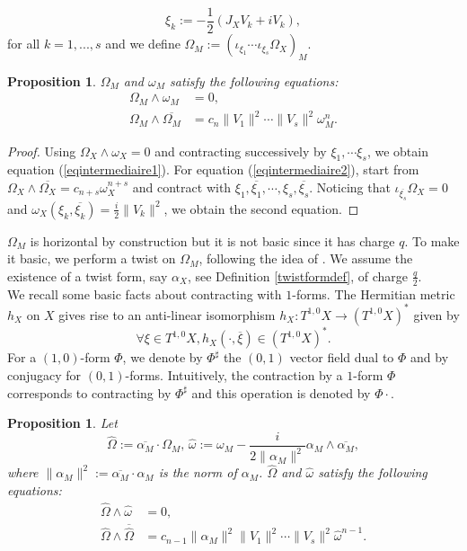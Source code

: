 \documentclass[12pt, reqno]{amsart}
\newtheorem{prop}[Def]{Proposition}
\begin{document}
\[\xi_k:=-\frac{1}{2}(J_XV_k+iV_k),\] for all $k=1,...,s$ and we define $\Omega_M:=(\iota_{\xi_1}\cdots\iota_{\xi_s}\Omega_X)_M$. 
\begin{prop} $\Omega_M$ and $\omega_M$ satisfy the following equations:
    \begin{align}
        \Omega_M\wedge\omega_M&=0, \label{eqintermediaire1} \\
        \Omega_M\wedge\overline{\Omega_M}&=c_n\|V_1\|^2\cdots\|V_s\|^2\omega_M^n.\label{eqintermediaire2}
    \end{align}
\end{prop}
\begin{proof}
    Using $\Omega_X\wedge\omega_X=0$ and contracting successively by $\xi_1,\cdots\xi_s$, we obtain equation (\ref{eqintermediaire1}). For equation  (\ref{eqintermediaire2}), start from $\Omega_X\wedge\overline{\Omega_X}=c_{n+s}\omega_X^{n+s}$ and contract with $\xi_1,\overline{\xi_1},\cdots,\xi_s,\overline{\xi_s}$. Noticing that $\iota_{\overline{\xi_s}}\Omega_X=0$ and $\omega_X(\xi_k,\overline{\xi_k})=\frac{i}{2}\|V_k\|^2$, we obtain the second equation.
\end{proof}
 \indent $\Omega_M$ is horizontal by construction but it is not basic since it has charge $q$. To make it basic, we perform a twist on $\Omega_M$, following the idea of \cite{Larfors_2013,Larfors_2010}. We assume the existence of a twist form, say $\alpha_X$, see Definition \ref{twistformdef}, of charge $\frac{q}{2}$.\\
 \indent We recall some basic facts about contracting with $1$-forms. The Hermitian metric $h_X$ on $X$ gives rise to an  anti-linear isomorphism $h_X : T^{1,0}X\to (T^{1,0}X)^*$ given by \[\forall\xi\in T^{1,0}X, h_X(\cdot,\overline{\xi})\in(T^{1,0}X)^*.\]\indent For a $(1,0)$-form $\Phi$, we denote by $\Phi^\sharp$ the $(0,1)$ vector field dual to $\Phi$ and by conjugacy for $(0,1)$-forms. Intuitively, the contraction by a $1$-form $\Phi$ corresponds to contracting by $\Phi^\sharp$ and this operation is denoted by $\Phi\cdot$.
 \begin{prop}
 Let \[\hat\Omega:=\overline{\alpha_M}\cdot\Omega_M,\,\hat\omega:=\omega_M-\frac{i}{2\|\alpha_M\|^2}\alpha_M\wedge\overline{\alpha_M},\] where $\|\alpha_M\|^2:=\overline{\alpha_M}\cdot\alpha_M$ is the norm of $\alpha_M$.
 $\hat\Omega$ and $\hat\omega$ satisfy the following equations:
     \begin{align}
             \hat\Omega\wedge\hat\omega&=0, \label{eqintermediate3}\\
         \hat\Omega\wedge\overline{\hat\Omega}&=c_{n-1}\|\alpha_M\|^2\|V_1\|^2\cdots\|V_s\|^2\hat\omega^{n-1}.\label{eqintermediate4} 
     \end{align}
 \end{prop}
\end{document}
